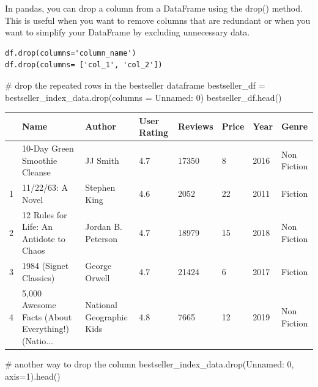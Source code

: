 \documentclass[
  letterpaper,
  DIV=11,
  numbers=noendperiod]{scrreprt}
\newenvironment{Shaded}{\begin{snugshade}}{\end{snugshade}}
\newcommand{\CommentTok}[1]{\textcolor[rgb]{0.37,0.37,0.37}{#1}}
\newcommand{\DecValTok}[1]{\textcolor[rgb]{0.68,0.00,0.00}{#1}}
\newcommand{\NormalTok}[1]{\textcolor[rgb]{0.00,0.23,0.31}{#1}}
\newcommand{\OperatorTok}[1]{\textcolor[rgb]{0.37,0.37,0.37}{#1}}
\newcommand{\StringTok}[1]{\textcolor[rgb]{0.13,0.47,0.30}{#1}}
\begin{document}
In pandas, you can drop a column from a DataFrame using the drop()
method. This is useful when you want to remove columns that are
redundant or when you want to simplify your DataFrame by excluding
unnecessary data.

\begin{verbatim}
df.drop(columns='column_name')
df.drop(columns= ['col_1', 'col_2'])
\end{verbatim}

\begin{Shaded}
\begin{Highlighting}[]
\CommentTok{\# drop the repeated rows in the bestseller dataframe}
\NormalTok{bestseller\_df }\OperatorTok{=}\NormalTok{ bestseller\_index\_data.drop(columns }\OperatorTok{=} \StringTok{\textquotesingle{}Unnamed: 0\textquotesingle{}}\NormalTok{)}
\NormalTok{bestseller\_df.head()}
\end{Highlighting}
\end{Shaded}

\begin{longtable}[]{@{}llllllll@{}}
\toprule\noalign{}
& Name & Author & User Rating & Reviews & Price & Year & Genre \\
\midrule\noalign{}
\endhead
\bottomrule\noalign{}
\endlastfoot
0 & 10-Day Green Smoothie Cleanse & JJ Smith & 4.7 & 17350 & 8 & 2016 &
Non Fiction \\
1 & 11/22/63: A Novel & Stephen King & 4.6 & 2052 & 22 & 2011 &
Fiction \\
2 & 12 Rules for Life: An Antidote to Chaos & Jordan B. Peterson & 4.7 &
18979 & 15 & 2018 & Non Fiction \\
3 & 1984 (Signet Classics) & George Orwell & 4.7 & 21424 & 6 & 2017 &
Fiction \\
4 & 5,000 Awesome Facts (About Everything!) (Natio... & National
Geographic Kids & 4.8 & 7665 & 12 & 2019 & Non Fiction \\
\end{longtable}

\begin{Shaded}
\begin{Highlighting}[]
\CommentTok{\# another way to drop the column}
\NormalTok{bestseller\_index\_data.drop(}\StringTok{\textquotesingle{}Unnamed: 0\textquotesingle{}}\NormalTok{, axis}\OperatorTok{=}\DecValTok{1}\NormalTok{).head()}
\end{Highlighting}
\end{Shaded}
\end{document}
